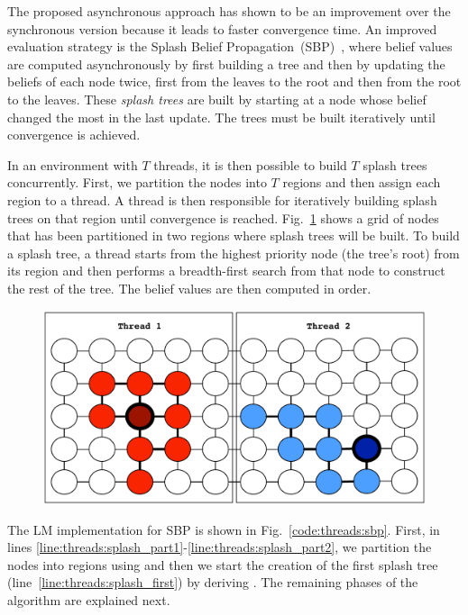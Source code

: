 

The proposed asynchronous approach has shown to be an improvement over the
synchronous version because it leads to faster convergence time. An improved
evaluation strategy is the Splash Belief
Propagation~(SBP)~\cite{Gonzalez+al:aistats09paraml}, where belief values are
computed asynchronously by first building a tree and then by updating the
beliefs of each node twice, first from the leaves to the root and then from the
root to the leaves. These \emph{splash trees} are built by starting at a node
whose belief changed the most in the last update. The trees must be built
iteratively until convergence is achieved.

In an environment with $T$ threads, it is then possible to build $T$ splash
trees concurrently. First, we partition the nodes into $T$ regions and then
assign each region to a thread. A thread is then responsible for iteratively
building splash trees on that region until convergence is reached.
Fig.~\ref{fig:threads:splash_bp} shows a grid of nodes that has been partitioned
in two regions where splash trees will be built. To build a splash tree, a
thread starts from the highest priority node (the tree's root) from its region
and then performs a breadth-first search from that node to construct the rest of
the tree. The belief values are then computed in order.

\begin{figure}[ht]
   \begin{center}
      \includegraphics[width=0.7\linewidth]{figures/threads/splash_bp}
   \end{center}
   \label{fig:threads:splash_bp}
\end{figure}

The LM implementation for SBP is shown in Fig.~\ref{code:threads:sbp}. First,
in lines \ref{line:threads:splash_part1}-\ref{line:threads:splash_part2}, we
partition the nodes into regions using  and then we start the
creation of the first splash tree (line~\ref{line:threads:splash_first}) by
deriving .  The remaining phases of the algorithm are
explained next.

